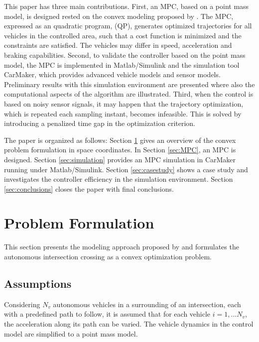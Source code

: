 \documentclass[letterpaper,10pt,conference]{ieeeconf}
\begin{document}
This paper has three main contributions. First, an MPC, based on a
point mass model, is designed
rested on the convex modeling proposed by \cite{nikolce}. The MPC,
expressed as an quadratic program, (QP),
generates optimized trajectories for all vehicles in the controlled
area, such that a cost function is minimized and the constraints are
satisfied. The vehicles may differ in speed, acceleration and braking
capabilities. 
Second, to validate the controller based on the point mass model,
the MPC is implemented in Matlab/Simulink and the simulation
tool CarMaker, which provides advanced vehicle models and sensor
models. Preliminary results with this simulation environment are
presented where also the computational aspects of the algorithm are
illustrated. Third, when the control is based on noisy sensor signals,
it may happen that the trajectory optimization, which is repeated each
sampling instant, becomes infeasible. This is solved by introducing a penalized
time gap in the optimization criterion.

The paper is organized as follows: Section \ref{sec:problem_formulation} gives an overview of the convex problem formulation in space coordinates. In Section \ref{sec:MPC}, an MPC is designed. Section \ref{sec:simulation} provides an MPC simulation in CarMaker running under Matlab/Simulink. Section \ref{sec:casestudy} shows a case study and investigates the controller efficiency in the simulation environment. Section \ref{sec:conclusions} closes the paper with final conclusions.

\section{Problem Formulation} \label{sec:problem_formulation}
This section presents the modeling approach proposed by \cite{nikolce} and formulates the autonomous intersection crossing as a convex optimization problem.

\subsection{Assumptions}
Considering $N_v$ autonomous vehicles in a surrounding of an intersection, each with a predefined path to follow, it is assumed that for each vehicle $i=1,...N_v$, the acceleration along its path can be varied. The vehicle dynamics in the control model are simplified to a point mass model.
\end{document}
